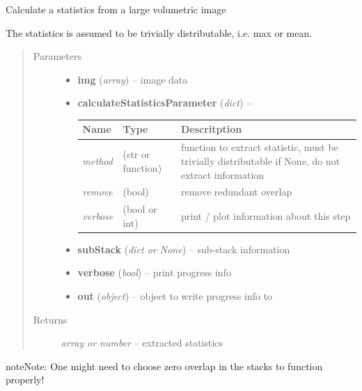 \documentclass[letterpaper,10pt,english]{sphinxmanual}
\begin{document}

\begin{fulllineitems}
\label{api/ClearMap.ImageProcessing:ClearMap.ImageProcessing.ImageStatistics.calculateStatisticsOnStack}
Calculate a statistics from a large volumetric image

The statistics is assumed to be trivially distributable, i.e. max or mean.
\begin{quote}\begin{description}
\item[{Parameters}] \leavevmode\begin{itemize}
\item {} 
\textbf{img} (\emph{array}) --
image data

\item {} 
\textbf{calculateStatisticsParameter} (\emph{dict}) --

\begin{tabulary}{\linewidth}{|L|L|L|}
\hline
\textsf{\relax 
Name
} & \textsf{\relax 
Type
} & \textsf{\relax 
Descritption
}\\
\hline
\emph{method}
 & 
(str or function)
 & 
function to extract statistic, must be trivially distributable
if None, do not extract information
\\
\hline
\emph{remove}
 & 
(bool)
 & 
remove redundant overlap
\\
\hline
\emph{verbose}
 & 
(bool or int)
 & 
print / plot information about this step
\\
\hline\end{tabulary}


\item {} 
\textbf{subStack} (\emph{dict or None}) --
sub-stack information

\item {} 
\textbf{verbose} (\emph{bool}) --
print progress info

\item {} 
\textbf{out} (\emph{object}) --
object to write progress info to

\end{itemize}

\item[{Returns}] \leavevmode
\emph{array or number} --
extracted statistics

\end{description}\end{quote}

\begin{notice}{note}{Note:}
One might need to choose zero overlap in the stacks to function properly!
\end{notice}

\end{fulllineitems}
\end{document}
